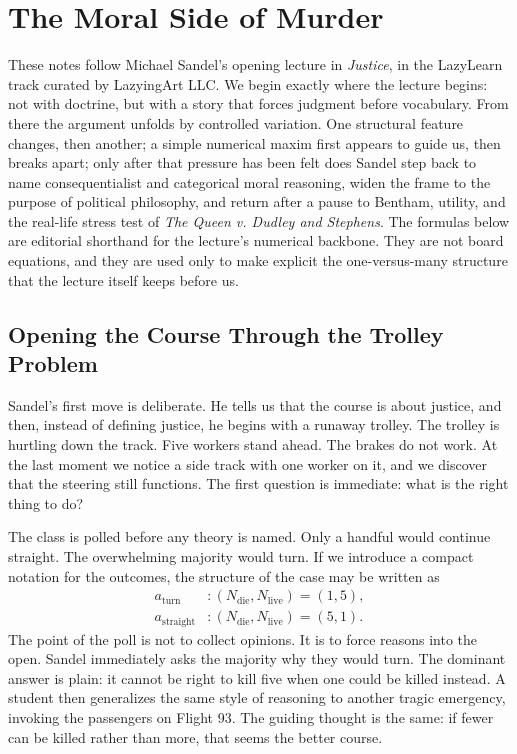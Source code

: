 \chapter{The Moral Side of Murder}

These notes follow Michael Sandel's opening lecture in \emph{Justice}, in the LazyLearn track curated by LazyingArt LLC. We begin exactly where the lecture begins: not with doctrine, but with a story that forces judgment before vocabulary. From there the argument unfolds by controlled variation. One structural feature changes, then another; a simple numerical maxim first appears to guide us, then breaks apart; only after that pressure has been felt does Sandel step back to name consequentialist and categorical moral reasoning, widen the frame to the purpose of political philosophy, and return after a pause to Bentham, utility, and the real-life stress test of \emph{The Queen v. Dudley and Stephens}. The formulas below are editorial shorthand for the lecture's numerical backbone. They are not board equations, and they are used only to make explicit the one-versus-many structure that the lecture itself keeps before us.

\section{Opening the Course Through the Trolley Problem}

Sandel's first move is deliberate. He tells us that the course is about justice, and then, instead of defining justice, he begins with a runaway trolley. The trolley is hurtling down the track. Five workers stand ahead. The brakes do not work. At the last moment we notice a side track with one worker on it, and we discover that the steering still functions. The first question is immediate: what is the right thing to do?

The class is polled before any theory is named. Only a handful would continue straight. The overwhelming majority would turn. If we introduce a compact notation for the outcomes, the structure of the case may be written as
\begin{align}
a_{\text{turn}} &: (N_{\text{die}},N_{\text{live}}) = (1,5), \\
a_{\text{straight}} &: (N_{\text{die}},N_{\text{live}}) = (5,1).
\end{align}
The point of the poll is not to collect opinions. It is to force reasons into the open. Sandel immediately asks the majority why they would turn. The dominant answer is plain: it cannot be right to kill five when one could be killed instead. A student then generalizes the same style of reasoning to another tragic emergency, invoking the passengers on Flight 93. The guiding thought is the same: if fewer can be killed rather than more, that seems the better course.

